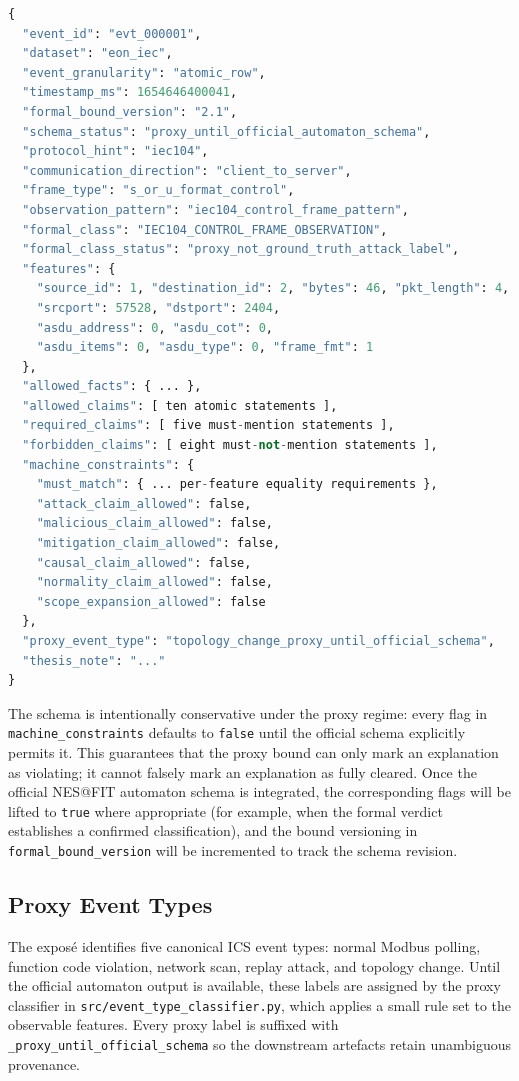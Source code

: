 \begin{lstlisting}[language=Python,caption={Canonical formal bound (proxy
schema v2.1).},label={lst:bound-example}]
{
  "event_id": "evt_000001",
  "dataset": "eon_iec",
  "event_granularity": "atomic_row",
  "timestamp_ms": 1654646400041,
  "formal_bound_version": "2.1",
  "schema_status": "proxy_until_official_automaton_schema",
  "protocol_hint": "iec104",
  "communication_direction": "client_to_server",
  "frame_type": "s_or_u_format_control",
  "observation_pattern": "iec104_control_frame_pattern",
  "formal_class": "IEC104_CONTROL_FRAME_OBSERVATION",
  "formal_class_status": "proxy_not_ground_truth_attack_label",
  "features": {
    "source_id": 1, "destination_id": 2, "bytes": 46, "pkt_length": 4,
    "srcport": 57528, "dstport": 2404,
    "asdu_address": 0, "asdu_cot": 0,
    "asdu_items": 0, "asdu_type": 0, "frame_fmt": 1
  },
  "allowed_facts": { ... },
  "allowed_claims": [ ten atomic statements ],
  "required_claims": [ five must-mention statements ],
  "forbidden_claims": [ eight must-not-mention statements ],
  "machine_constraints": {
    "must_match": { ... per-feature equality requirements },
    "attack_claim_allowed": false,
    "malicious_claim_allowed": false,
    "mitigation_claim_allowed": false,
    "causal_claim_allowed": false,
    "normality_claim_allowed": false,
    "scope_expansion_allowed": false
  },
  "proxy_event_type": "topology_change_proxy_until_official_schema",
  "thesis_note": "..."
}
\end{lstlisting}

The schema is intentionally conservative under the proxy regime: every flag
in \texttt{machine\_constraints} defaults to \texttt{false} until the
official schema explicitly permits it. This guarantees that the proxy bound
can only mark an explanation as violating; it cannot falsely mark an
explanation as fully cleared. Once the official NES@FIT automaton schema is
integrated, the corresponding flags will be lifted to \texttt{true} where
appropriate (for example, when the formal verdict establishes a confirmed
classification), and the bound versioning in \texttt{formal\_bound\_version}
will be incremented to track the schema revision.

\subsection{Proxy Event Types}
\label{subsec:proxy-event-types}

The exposé identifies five canonical ICS event types: normal Modbus polling,
function code violation, network scan, replay attack, and topology change.
Until the official automaton output is available, these labels are assigned
by the proxy classifier in \texttt{src/event\_type\_classifier.py}, which
applies a small rule set to the observable features. Every proxy label is
suffixed with \texttt{\_proxy\_until\_official\_schema} so the downstream
artefacts retain unambiguous provenance.


